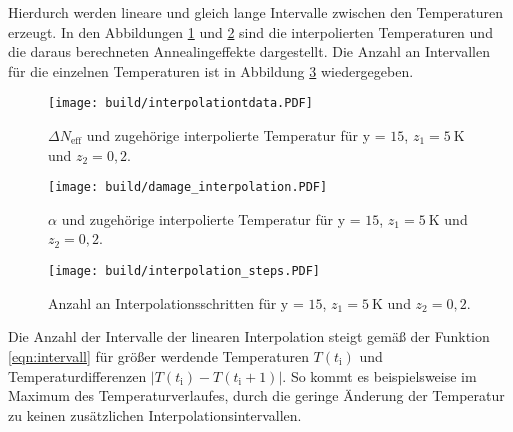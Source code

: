 Hierdurch werden lineare und gleich lange Intervalle zwischen den Temperaturen
erzeugt. In den Abbildungen \ref{fig:interpolation_N_eff} und \ref{fig:interpolation_damage} sind die interpolierten Temperaturen und
die daraus berechneten Annealingeffekte dargestellt. Die Anzahl an Intervallen für die
einzelnen Temperaturen ist in Abbildung \ref{fig:interpolation_steps} wiedergegeben.

\begin{figure}
  \centering
    \texttt{[image: build/interpolationtdata.PDF]}
\caption{$\Delta N_{\mathrm{eff}}$ und zugehörige interpolierte Temperatur für y = $15$, $z_1=\SI{5}{\kelvin}$ und $z_2=0,2$.}
\label{fig:interpolation_N_eff}
\end{figure}



\begin{figure}
  \centering
    \texttt{[image: build/damage\_interpolation.PDF]}
\caption{$\alpha$ und zugehörige interpolierte Temperatur für y = $15$, $z_1=\SI{5}{\kelvin}$ und $z_2=0,2$.}
\label{fig:interpolation_damage}
\end{figure}

\begin{figure}
  \centering
    \texttt{[image: build/interpolation\_steps.PDF]}
\caption{Anzahl an Interpolationsschritten für y = $15$, $z_1=\SI{5}{\kelvin}$ und $z_2=0,2$.}
\label{fig:interpolation_steps}
\end{figure}


Die Anzahl der Intervalle der linearen Interpolation steigt gemäß der Funktion \ref{eqn:intervall}
für größer werdende Temperaturen $T(t_{\mathrm{i}})$ und Temperaturdifferenzen
$|T(t_{\mathrm{i}})-T(t_{\mathrm{i}}+1)|$. So kommt es beispielsweise im Maximum des Temperaturverlaufes, durch
die geringe Änderung der Temperatur zu keinen zusätzlichen Interpolationsintervallen.

